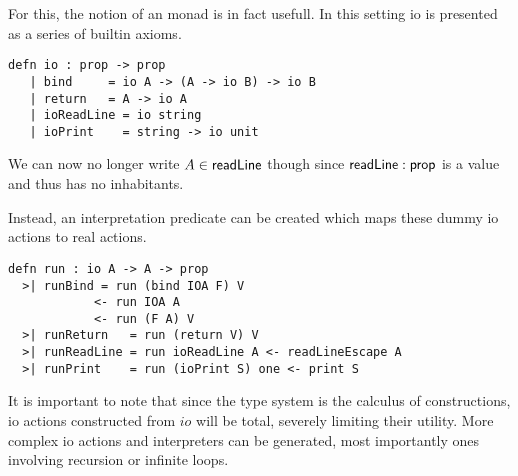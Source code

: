 For this, the notion of an monad is in fact usefull.  
In this setting io is presented as a series of builtin axioms.

\begin{lstlisting}
defn io : prop -> prop
   | bind     = io A -> (A -> io B) -> io B
   | return   = A -> io A
   | ioReadLine = io string
   | ioPrint    = string -> io unit
\end{lstlisting}

We can now no longer write $A \in \mathsf{readLine}$ though since $\mathsf{readLine} : \mathsf{prop}$ 
is a value and thus has no inhabitants. 

Instead, an interpretation predicate can be created which maps these dummy io actions to real actions.

\begin{lstlisting}
defn run : io A -> A -> prop
  >| runBind = run (bind IOA F) V
            <- run IOA A 
            <- run (F A) V 
  >| runReturn   = run (return V) V
  >| runReadLine = run ioReadLine A <- readLineEscape A
  >| runPrint    = run (ioPrint S) one <- print S
\end{lstlisting}

It is important to note that since the type system is the calculus of constructions, io actions constructed
from $io$ will be total, severely limiting their utility.
More complex io actions and interpreters can be generated, most importantly ones involving recursion 
or infinite loops.
